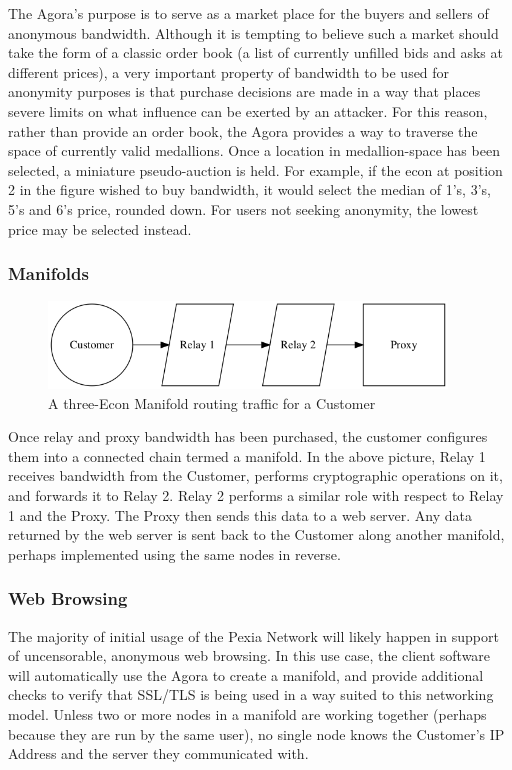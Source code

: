 \documentclass{article}
\newcommand{\mesh}{Pexia}
\begin{document}
The Agora’s purpose is to serve as a market place for the buyers and sellers of anonymous bandwidth. Although it is tempting to believe such a market should take the form of a classic order book (a list of currently unfilled bids and asks at different prices), a very important property of bandwidth to be used for anonymity purposes is that purchase decisions are made in a way that places severe limits on what influence can be exerted by an attacker. For this reason, rather than provide an order book, the Agora provides a way to traverse the space of currently valid medallions. Once a location in medallion-space has been selected, a miniature pseudo-auction is held. For example, if the econ at position 2 in the figure wished to buy bandwidth, it would select the median of 1’s, 3’s, 5’s and 6’s price, rounded down. For users not seeking anonymity, the lowest price may be selected instead.

\subsubsection{Manifolds}

\begin{figure}[htbp]
  \centering
  \includegraphics[width = 300pt]{sttc}
  \caption{A three-Econ Manifold routing traffic for a Customer}
\end{figure}

Once relay and proxy bandwidth has been purchased, the customer configures them into a connected chain termed a manifold. In the above picture, Relay 1 receives bandwidth from the Customer, performs cryptographic operations on it, and forwards it to Relay 2. Relay 2 performs a similar role with respect to Relay 1 and the Proxy. The Proxy then sends this data to a web server. Any data returned by the web server is sent back to the Customer along another manifold, perhaps implemented using the same nodes in reverse.

\subsubsection{Web Browsing}

The majority of initial usage of the \mesh{} Network will likely happen in support of uncensorable, anonymous web browsing. In this use case, the client software will automatically use the Agora to create a manifold, and provide additional checks to verify that SSL/TLS is being used in a way suited to this networking model. Unless two or more nodes in a manifold are working together (perhaps because they are run by the same user), no single node knows the Customer's IP Address and the server they communicated with.
\end{document}
